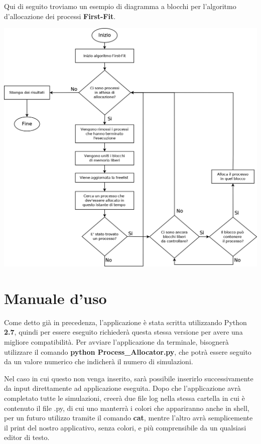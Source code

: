 \documentclass[20pt,a4paper,oneside]{article}
\begin{document}
\newpage

Qui di seguito troviamo un esempio di diagramma a blocchi per l'algoritmo d'allocazione dei processi \textbf{First-Fit}.\\
\begin{center}\includegraphics[scale=0.26]{AD2}\end{center}

\newpage

\section{Manuale d'uso}
Come detto già in precedenza, l'applicazione è stata scritta utilizzando Python \textbf{2.7}, quindi per essere eseguito richiederà questa stessa versione per avere una migliore compatibilità. Per avviare l'applicazione da terminale, bisognerà utilizzare il comando \textbf{python Process\_Allocator.py}, che potrà essere seguito da un valore numerico che indicherà il numero di simulazioni. \par
Nel caso in cui questo non venga inserito, sarà possibile inserirlo successivamente da input direttamente ad applicazione eseguita. Dopo che l'applicazione avrà completato tutte le simulazioni, creerà due file log nella stessa cartella in cui è contenuto il file .py, di cui uno manterrà i colori che appariranno anche in shell, per un futuro utilizzo tramite il comando \textbf{cat}, mentre l'altro avrà semplicemente il print del nostro applicativo, senza colori, e più comprensibile da un qualsiasi editor di testo. 
\end{document}
